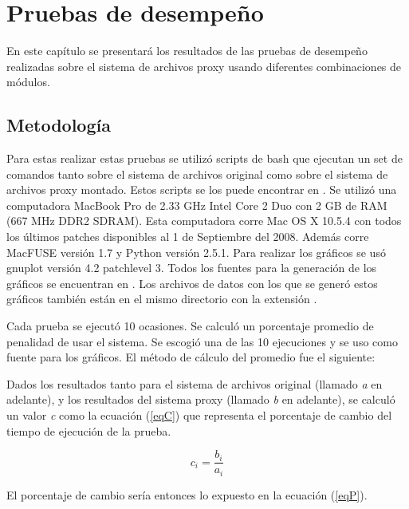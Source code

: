 \chapter{Pruebas de desempeño}
\ifpdf
    \graphicspath{{Chapter4/Chapter4Figs/PNG/}{Chapter4/Chapter4Figs/PDF/}{Chapter4/Chapter4Figs/}}
\else
    \graphicspath{{Chapter4/Chapter4Figs/EPS/}{Chapter4/Chapter4Figs/}}
\fi

En este capítulo se presentará los resultados de las pruebas de desempeño realizadas sobre el sistema de archivos proxy usando diferentes combinaciones de módulos.


\section{Metodología}

Para estas realizar estas pruebas se utilizó scripts de bash que ejecutan un set de comandos tanto sobre el sistema de archivos original como sobre el sistema de archivos proxy montado. Estos scripts se los puede encontrar en . Se utilizó una computadora MacBook Pro de 2.33 GHz Intel Core 2 Duo con 2 GB de RAM (667 MHz DDR2 SDRAM). Esta computadora corre Mac OS X 10.5.4 con todos los últimos patches disponibles al 1 de Septiembre del 2008. Además corre MacFUSE versión 1.7 y Python versión 2.5.1. Para realizar los gráficos se usó gnuplot versión 4.2 patchlevel 3. Todos los fuentes para la generación de los gráficos se encuentran en . Los archivos de datos con los que se generó estos gráficos también están en el mismo directorio con la extensión .

Cada prueba se ejecutó 10 ocasiones.  Se calculó un porcentaje promedio de penalidad de usar el sistema. Se escogió una de las 10 ejecuciones y se uso como fuente para los gráficos. El método de cálculo del promedio fue el siguiente:

Dados los resultados tanto para el sistema de archivos original (llamado \textit{a} en adelante), y los resultados del sistema proxy (llamado \textit{b} en adelante), se calculó un valor \textit{c} como la ecuación (\ref{eqC}) que representa el porcentaje de cambio del tiempo de ejecución de la prueba.

\begin{equation}
\label{eqC}
c_{i} = \frac{b_{i}}{a_{i}}
\end{equation}

El porcentaje de cambio sería entonces lo expuesto en la ecuación (\ref{eqP}).

